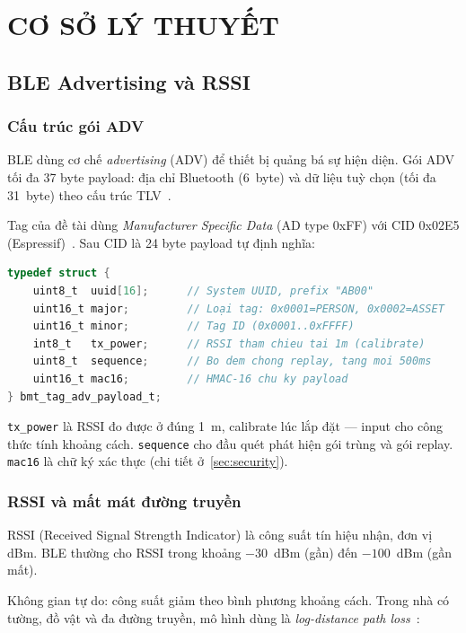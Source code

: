 \chapter{CƠ SỞ LÝ THUYẾT}
\label{Chapter3}

\section{BLE Advertising và RSSI}

\subsection{Cấu trúc gói ADV}

BLE dùng cơ chế \textit{advertising} (ADV) để thiết bị quảng bá sự hiện diện. Gói ADV tối đa 37 byte payload: địa chỉ Bluetooth (6~byte) và dữ liệu tuỳ chọn (tối đa 31~byte) theo cấu trúc TLV~\cite{ble-core-spec}.

Tag của đề tài dùng \textit{Manufacturer Specific Data} (AD type 0xFF) với CID 0x02E5 (Espressif)~\cite{ble-cid}. Sau CID là 24 byte payload tự định nghĩa:

\begin{lstlisting}[language=C,caption=Cấu trúc payload beacon tag]
typedef struct {
    uint8_t  uuid[16];      // System UUID, prefix "AB00"
    uint16_t major;         // Loại tag: 0x0001=PERSON, 0x0002=ASSET
    uint16_t minor;         // Tag ID (0x0001..0xFFFF)
    int8_t   tx_power;      // RSSI tham chieu tai 1m (calibrate)
    uint8_t  sequence;      // Bo dem chong replay, tang moi 500ms
    uint16_t mac16;         // HMAC-16 chu ky payload
} bmt_tag_adv_payload_t;
\end{lstlisting}

\texttt{tx\_power} là RSSI đo được ở đúng 1~m, calibrate lúc lắp đặt --- input cho công thức tính khoảng cách. \texttt{sequence} cho đầu quét phát hiện gói trùng và gói replay. \texttt{mac16} là chữ ký xác thực (chi tiết ở~\ref{sec:security}).

\subsection{RSSI và mất mát đường truyền}

RSSI (Received Signal Strength Indicator) là công suất tín hiệu nhận, đơn vị dBm. BLE thường cho RSSI trong khoảng $-30$~dBm (gần) đến $-100$~dBm (gần mất).

Không gian tự do: công suất giảm theo bình phương khoảng cách. Trong nhà có tường, đồ vật và đa đường truyền, mô hình dùng là \textit{log-distance path loss}~\cite{rappaport-wireless}:

